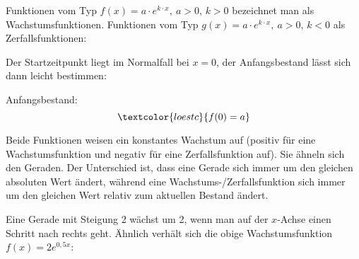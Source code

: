 Funktionen vom Typ \(f(x)=a\cdot e^{k\cdot x},\ a > 0,\,k > 0\) bezeichnet man als Wachstumsfunktionen. Funktionen vom Typ \(g(x)=a\cdot e^{k\cdot x},\ a > 0,\,k < 0\) als Zerfallsfunktionen:

\medskip

\begin{minipage}{\textwidth}
\end{minipage}

Der Startzeitpunkt liegt im Normalfall bei \(x=0\), der Anfangsbestand lässt sich dann leicht bestimmen:

\begin{tcolorbox}Anfangsbestand:
	\[\textcolor{loestc}{f(0)=a}\]
\end{tcolorbox}

Beide Funktionen weisen ein konstantes Wachstum auf (positiv für eine Wachstumsfunktion und negativ für eine Zerfallsfunktion auf). Sie ähneln sich den Geraden. Der Unterschied ist, dass eine Gerade sich immer um den gleichen absoluten Wert ändert, während eine Wachstums-/Zerfallsfunktion sich immer um den gleichen Wert relativ zum aktuellen Bestand ändert.

Eine Gerade mit Steigung 2 wächst um 2, wenn man auf der \(x\)-Achse einen Schritt nach rechts geht. Ähnlich verhält sich die obige Wachstumsfunktion \(f(x)=2e^{0,5x}\):

\medskip

